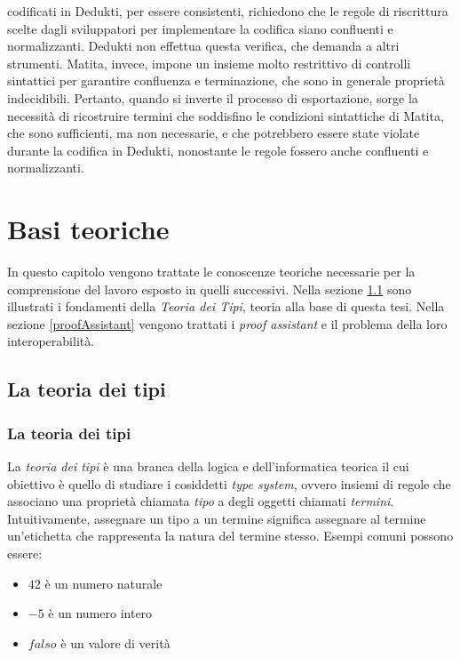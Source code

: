 \documentclass[12pt,a4paper]{mimosis}
\begin{document}
codificati in Dedukti, per essere consistenti, richiedono che le regole di riscrittura
scelte dagli sviluppatori per implementare la codifica siano confluenti e normalizzanti.
Dedukti non effettua questa verifica, che demanda a altri strumenti. Matita, invece, impone
un insieme molto restrittivo di controlli sintattici per garantire confluenza e terminazione,
che sono in generale proprietà indecidibili. Pertanto, quando si inverte il processo di
esportazione, sorge la necessità di ricostruire termini che soddisfino le condizioni 
sintattiche di Matita, che sono sufficienti, ma non necessarie, e che potrebbero essere
state violate durante la codifica in Dedukti, nonostante le regole fossero anche confluenti
e normalizzanti.

\chapter{Basi teoriche}
In questo capitolo vengono trattate le conoscenze teoriche necessarie per la
comprensione del lavoro esposto in quelli successivi. Nella sezione \ref{teoriaDeiTipi}
sono illustrati i fondamenti della \textit{Teoria dei Tipi}, teoria alla base 
di questa tesi. Nella sezione \ref{proofAssistant} vengono trattati i \textit{proof 
assistant} e il problema della loro interoperabilità.

\section{La teoria dei tipi} \label{teoriaDeiTipi}
\subsection{La teoria dei tipi}
La \textit{teoria dei tipi} è una branca della logica e dell'informatica teorica il
cui obiettivo è quello di studiare i cosiddetti \textit{type system}, ovvero
insiemi di regole che associano una proprietà chiamata \textit{tipo} a degli oggetti
chiamati \textit{termini}. Intuitivamente, assegnare un tipo a un termine significa
assegnare al termine un'etichetta che rappresenta la natura del termine stesso.
Esempi comuni possono essere: 
\begin{itemize}
  \item $42$ è un numero naturale 
  \item $-5$ è un numero intero
  \item $falso$ è un valore di verità 
\end{itemize}
\end{document}
